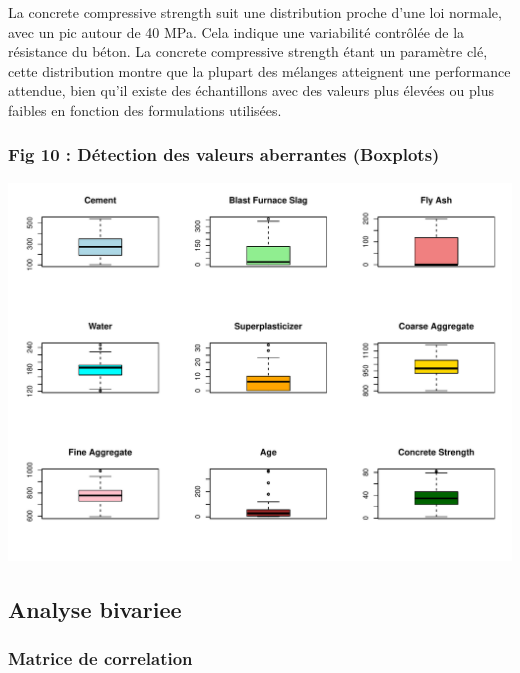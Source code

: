\documentclass[
  12pt,
]{article}
\begin{document}
La concrete compressive strength suit une distribution proche d'une loi
normale, avec un pic autour de 40 MPa. Cela indique une variabilité
contrôlée de la résistance du béton. La concrete compressive strength
étant un paramètre clé, cette distribution montre que la plupart des
mélanges atteignent une performance attendue, bien qu'il existe des
échantillons avec des valeurs plus élevées ou plus faibles en fonction
des formulations utilisées.

\subsubsection{Fig 10 : Détection des valeurs aberrantes
(Boxplots)}\label{fig-10-duxe9tection-des-valeurs-aberrantes-boxplots}

\includegraphics{rmd_final_files/figure-latex/boxplots_outliers-1.pdf}

\subsection{Analyse bivariee}\label{analyse-bivariee}

\subsubsection{Matrice de correlation}\label{matrice-de-correlation}
\end{document}

